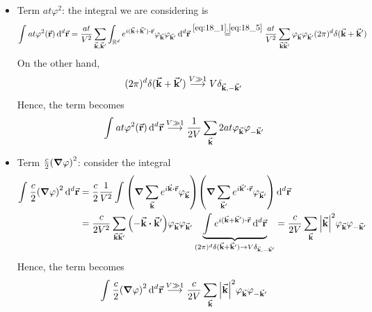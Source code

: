 \documentclass[../main/main.tex]{subfiles}
\begin{document}
\begin{itemize}
\item Term \( a t \varphi ^2 \): the integral we are considering is
\begin{equation*}
  \int_{}^{}  a t \varphi ^2 (\va{r}) \dd[d]{\va{r}}= \frac{a t}{V^2} \sum_{\va{k},\va{k}'}^{}  \int_{\R^d}^{} e^{i (\va{k}+\va{k}') \vdot \va{r}} \varphi _{\va{k}} \varphi _{\va{k}'} \dd[d]{\va{r}}
  \overset{\eqref{eq:18_1},\eqref{eq:18_5}}{=}  \frac{at}{V^2} \sum_{\va{k}\va{k}'}^{} \varphi _{\va{k}} \varphi _{\va{k}'} (2 \pi )^d \delta (\va{k}+\va{k}')
\end{equation*}
On the other hand,
\begin{equation*}
  (2 \pi )^d \delta (\va{k}+ \va{k}') \overset{V \gg 1 }{\longrightarrow} V \delta _{\va{k},-\va{k}'}
\end{equation*}
Hence, the term becomes
\begin{equation}
   \int_{}^{}  a t \varphi ^2 (\va{r}) \dd[d]{\va{r}} \overset{V \gg 1 }{\longrightarrow} \frac{1}{2V} \sum_{\va{k}}^{} 2 a t  \varphi _{\va{k}} \varphi _{-\va{k}'}
   \label{eq:18_6}
\end{equation}



\item Term \( \frac{c}{2} \qty(\grad \varphi )^2    \): consider the integral
\begin{equation*}
\begin{split}
  \int_{}^{}  \frac{c}{2} \qty(\grad \varphi )^2 \dd[d]{\va{r}} & =
  \frac{c}{2} \frac{1}{V^2} \int_{}^{} \qty(\grad \sum_{\va{k}}^{} e^{i \va{k} \vdot \va{r}} \varphi _{\va{k}}  ) \qty(\grad \sum_{\va{k}'}^{} e^{i \va{k}' \vdot \va{r} } \varphi _{\va{k}'}  )  \dd[d]{\va{r}}    \\
  & = \frac{c}{2 V^2} \sum_{\va{k} \va{k}'}^{}  \qty( - \va{k} \vdot \va{k}') \varphi _{\va{k}} \varphi _{\va{k}'} \underbrace{ \int_{}^{}  e^{i (\va{k}+\va{k}')\vdot \va{r}} \dd[d]{\va{r}}   }_{(2 \pi )^d \delta (\va{k}+ \va{k}') \rightarrow V \delta _{\va{k},-\va{k}'} }
   = \frac{c}{2V} \sum_{\va{k}}^{} \abs{\va{k}}^2 \varphi _{\va{k}} \varphi _{-\va{k}'}
\end{split}
\end{equation*}
Hence, the term becomes
\begin{equation}
  \int_{}^{}  \frac{c}{2} \qty(\grad \varphi )^2 \dd[d]{\va{r}}
\overset{V \gg 1 }{\longrightarrow}
   \frac{c}{2V} \sum_{\va{k}}^{} \abs{\va{k}}^2 \varphi _{\va{k}} \varphi _{-\va{k}'}
   \label{eq:18_7}
\end{equation}

\end{itemize}
\end{document}
